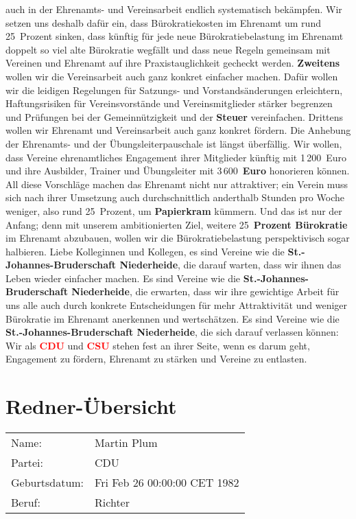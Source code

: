 \documentclass{article}
\begin{document}
auch in der Ehrenamts- und Vereinsarbeit endlich systematisch bekämpfen. Wir setzen uns deshalb dafür ein, dass Bürokratiekosten im Ehrenamt um rund 25 Prozent sinken, dass künftig für jede neue Bürokratiebelastung im Ehrenamt doppelt so viel alte Bürokratie wegfällt und dass neue Regeln gemeinsam mit Vereinen und Ehrenamt auf ihre Praxistauglichkeit gecheckt werden. \textbf{Zweitens} wollen wir die Vereinsarbeit auch ganz konkret einfacher machen. Dafür wollen wir die leidigen Regelungen für Satzungs- und Vorstandsänderungen erleichtern, Haftungsrisiken für Vereinsvorstände und Vereinsmitglieder stärker begrenzen und Prüfungen bei der Gemeinnützigkeit und der \textbf{Steuer} vereinfachen. Drittens wollen wir Ehrenamt und Vereinsarbeit auch ganz konkret fördern. Die Anhebung der Ehrenamts- und der Übungsleiterpauschale ist längst überfällig. Wir wollen, dass Vereine ehrenamtliches Engagement ihrer Mitglieder künftig mit 1 200 Euro und ihre Ausbilder, Trainer und Übungsleiter mit 3 600 \textbf{Euro} honorieren können.  All diese Vorschläge machen das Ehrenamt nicht nur attraktiver; ein Verein muss sich nach ihrer Umsetzung auch durchschnittlich anderthalb Stunden pro Woche weniger, also rund 25 Prozent, um \textbf{Papierkram} kümmern. Und das ist nur der Anfang; denn mit unserem ambitionierten Ziel, weitere 25 \textbf{Prozent Bürokratie} im Ehrenamt abzubauen, wollen wir die Bürokratiebelastung perspektivisch sogar halbieren. Liebe Kolleginnen und Kollegen, es sind Vereine wie die \textbf{St.-Johannes-Bruderschaft Niederheide}, die darauf warten, dass wir ihnen das Leben wieder einfacher machen. Es sind Vereine wie die \textbf{St.-Johannes-Bruderschaft Niederheide}, die erwarten, dass wir ihre gewichtige Arbeit für uns alle auch durch konkrete Entscheidungen für mehr Attraktivität und weniger Bürokratie im Ehrenamt anerkennen und wertschätzen. Es sind Vereine wie die \textbf{St.-Johannes-Bruderschaft Niederheide}, die sich darauf verlassen können: Wir als \textcolor{red}{\textbf{CDU}} und \textcolor{red}{\textbf{CSU}} stehen fest an ihrer Seite, wenn es darum geht, Engagement zu fördern, Ehrenamt zu stärken und Vereine zu entlasten.  \section{Redner-Übersicht}
\begin{tabular}{ll}
Name: & Martin Plum \\
Partei: & CDU \\
Geburtsdatum: & Fri Feb 26 00:00:00 CET 1982 \\
Beruf: & Richter \\
\end{tabular}
\end{document}
